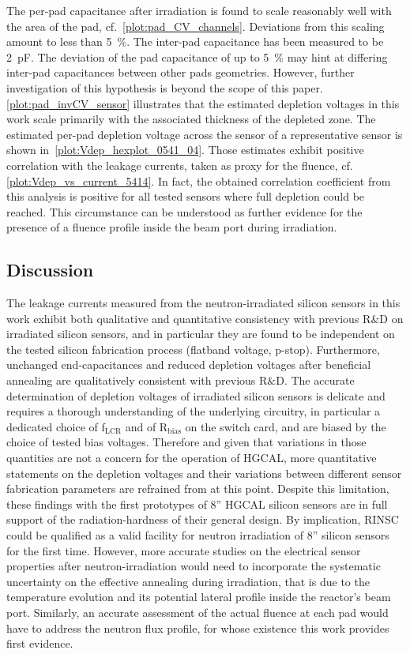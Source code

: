 The per-pad capacitance after irradiation is found to scale reasonably well with the area of the pad, cf.~\ref{plot:pad_CV_channels}.
Deviations from this scaling amount to less than \SI{5}{\percent}.
The inter-pad capacitance has been measured to be \SI{2}{\pico\farad}.
The deviation of the pad capacitance of up to \SI{5}{\percent} may hint at differing inter-pad capacitances between other pads geometries.
However, further investigation of this hypothesis is beyond the scope of this paper. 
\ref{plot:pad_invCV_sensor} illustrates that the estimated depletion voltages in this work scale primarily with the associated thickness of the depleted zone. 
The estimated per-pad depletion voltage across the sensor of a representative sensor is shown in~\ref{plot:Vdep_hexplot_0541_04}.
Those estimates exhibit positive correlation with the leakage currents, taken as proxy for the fluence, cf. \ref{plot:Vdep_vs_current_5414}.
In fact, the obtained correlation coefficient from this analysis is positive for all tested sensors where full depletion could be reached.
This circumstance can be understood as further evidence for the presence of a fluence profile inside the beam port during irradiation.

\subsection{Discussion}
\label{subsec:discussion}
The leakage currents measured from the neutron-irradiated silicon sensors in this work exhibit both qualitative and quantitative consistency with previous R$\&$D on irradiated silicon sensors, and in particular they are found to be independent on the tested silicon fabrication process (flatband voltage, p-stop).
Furthermore, unchanged end-capacitances and reduced depletion voltages after beneficial annealing are qualitatively consistent with previous R$\&$D.
The accurate determination of depletion voltages of irradiated silicon sensors is delicate and requires a thorough understanding of the underlying circuitry, in particular a dedicated choice of f$_\text{LCR}$ and of R$_\text{bias}$ on the switch card, and are biased by the choice of tested bias voltages.
Therefore and given that variations in those quantities are not a concern for the operation of HGCAL, more quantitative statements on the depletion voltages and their variations between different sensor fabrication parameters are refrained from at this point.\newline
Despite this limitation, these findings with the first prototypes of 8'' HGCAL silicon sensors are in full support of the radiation-hardness of their general design.
By implication, RINSC could be qualified as a valid facility for neutron irradiation of 8'' silicon sensors for the first time.
However, more accurate studies on the electrical sensor properties after neutron-irradiation would need to incorporate the systematic uncertainty on the effective annealing during irradiation, that is due to the temperature evolution and its potential lateral profile inside the reactor's beam port.
Similarly, an accurate assessment of the actual fluence at each pad would have to address the neutron flux profile, for whose existence this work provides first evidence.
